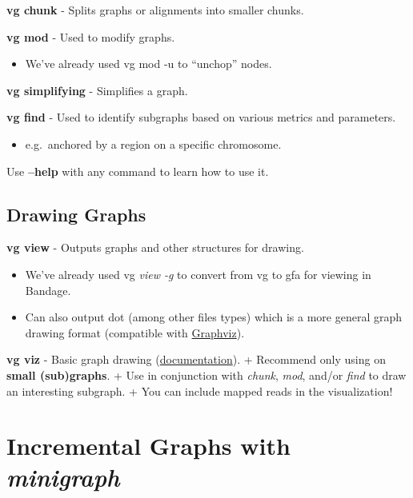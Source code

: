 \documentclass[
]{book}
\providecommand{\tightlist}{%
  \setlength{\itemsep}{0pt}\setlength{\parskip}{0pt}}
\begin{document}
\textbf{vg chunk} - Splits graphs or alignments into smaller chunks.

\textbf{vg mod} - Used to modify graphs.

\begin{itemize}
\tightlist
\item
  We've already used vg mod -u to ``unchop'' nodes.
\end{itemize}

\textbf{vg simplifying} - Simplifies a graph.

\textbf{vg find} - Used to identify subgraphs based on various metrics and parameters.

\begin{itemize}
\tightlist
\item
  e.g.~anchored by a region on a specific chromosome.
\end{itemize}

Use \textbf{--help} with any command to learn how to use it.

\hypertarget{drawing-graphs}{%
\section{Drawing Graphs}\label{drawing-graphs}}

\textbf{vg view} - Outputs graphs and other structures for drawing.

\begin{itemize}
\tightlist
\item
  We've already used vg \emph{view -g} to convert from vg to gfa for viewing in Bandage.
\item
  Can also output dot (among other files types) which is a more general graph drawing format (compatible with \href{https://graphviz.org}{Graphviz}).
\end{itemize}

\textbf{vg viz} - Basic graph drawing (\href{https://github.com/vgteam/vg/wiki/Visualization}{documentation}).
+ Recommend only using on \textbf{small (sub)graphs}.
+ Use in conjunction with \emph{chunk}, \emph{mod}, and/or \emph{find} to draw an interesting subgraph.
+ You can include mapped reads in the visualization!

\hypertarget{incremental-graphs-with-minigraph}{%
\chapter{\texorpdfstring{Incremental Graphs with \emph{minigraph}}{Incremental Graphs with minigraph}}\label{incremental-graphs-with-minigraph}}
\end{document}
